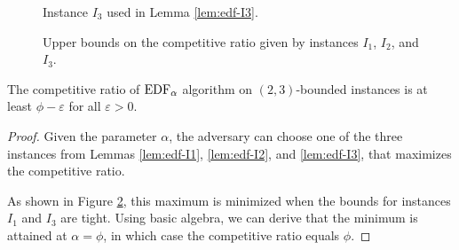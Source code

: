 \begin{figure}[ht]\centering
{}
\caption{Instance $I_3$ used in Lemma \ref{lem:edf-I3}.}
\label{img:edf-I3}
\end{figure}

\begin{figure}[ht]\centering

\caption{Upper bounds on the competitive ratio given by instances $I_1$, $I_2$, and $I_3$.}
\label{img:edf-instances-plot}
\end{figure}

\begin{thm}
The competitive ratio of $\text{EDF}_\alpha$ algorithm on $(2,3)$-bounded instances is at
least $\phi - \varepsilon$ for all $\varepsilon > 0$.
\end{thm}
\begin{proof}
Given the parameter $\alpha$, the adversary can choose one of the three
instances from Lemmas \ref{lem:edf-I1}, \ref{lem:edf-I2}, and \ref{lem:edf-I3},
that maximizes the competitive ratio.

As shown in Figure \ref{img:edf-instances-plot}, this maximum is minimized when
the bounds for instances $I_1$ and $I_3$ are tight. Using basic algebra, we can
derive that the minimum is attained at $\alpha = \phi$, in which case the
competitive ratio equals $\phi$.
\end{proof}
